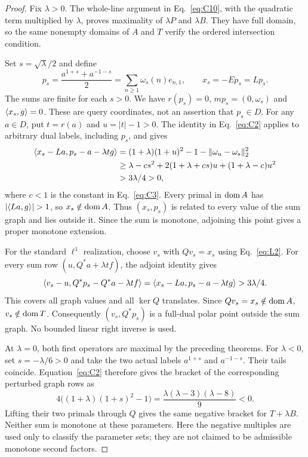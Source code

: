 \begin{proof}
Fix $\lambda>0$. The whole-line argument in Eq.~\eqref{eq:C10}, with
the quadratic term multiplied by $\lambda$, proves maximality of
$\lambda P$ and $\lambda B$. They have full domain, so the same nonempty
domains of $A$ and $T$ verify the ordered intersection condition.

Set $s=\sqrt\lambda/2$ and define
\begin{equation}
p_s=\frac{a^{1+s}+a^{-1-s}}2
   =\sum_{n\ge1}\omega_s(n)e_{n,1},\qquad x_s=-Ep_s=Lp_s.
\label{eq:parameter-query}
\end{equation}
The sums are finite for each $s>0$. We have $r(p_s)=0$,
$mp_s=(0,\omega_s)$ and $\langle x_s,g\rangle=0$. These are query coordinates,
not an assertion that $p_s\in D$.
For any $a\in D$, put $t=r(a)$ and $u=|t|-1>0$.
The identity in Eq.~\eqref{eq:C2} applies to arbitrary dual labels,
including $p_s$, and gives
\begin{equation}
\begin{aligned}
\langle x_s-La,p_s-a-\lambda t g\rangle
 &=(1+\lambda)(1+u)^2-1-\|\omega_u-\omega_s\|_2^2\\
 &\ge\lambda-cs^2+2(1+\lambda+cs)u+(1+\lambda-c)u^2\\
 &>3\lambda/4>0,
\end{aligned}
\label{eq:parameter-bracket}
\end{equation}
where $c<1$ is the constant in Eq.~\eqref{eq:C3}.
Every primal in $\operatorname{dom} A$ has $|\pair{La}{g}|>1$, so $x_s\notin\operatorname{dom} A$.
Thus $(x_s,p_s)$ is related to every value of the sum graph and lies
outside it. Since the sum is monotone, adjoining this point gives a
proper monotone extension.

For the standard $\ell^1$ realization, choose $v_s$ with $Qv_s=x_s$
using Eq.~\eqref{eq:L2}. For every sum row $(u,Q^*a+\lambda t f)$,
the adjoint identity gives
\begin{equation}
\langle v_s-u,Q^*p_s-Q^*a-\lambda t f\rangle
=\langle x_s-La,p_s-a-\lambda t g\rangle>3\lambda/4.
\label{eq:parameter-l1}
\end{equation}
This covers all graph values and all $\ker Q$ translates.
Since $Qv_s=x_s\notin\operatorname{dom} A$, $v_s\notin\operatorname{dom} T$.
Consequently $(v_s,Q^*p_s)$ is a full-dual polar point outside the sum
graph. No bounded linear right inverse is used.

At $\lambda=0$, both first operators are maximal by the preceding
theorems. For $\lambda<0$, set $s=-\lambda/6>0$ and take the two actual
labels $a^{1+s}$ and $a^{-1-s}$. Their tails coincide. Equation~\eqref{eq:C2}
therefore gives the bracket of the corresponding perturbed graph rows as
\begin{equation}
4\big((1+\lambda)(1+s)^2-1\big)
=\frac{\lambda(\lambda-3)(\lambda-8)}9<0.
\label{eq:parameter-negative}
\end{equation}
Lifting their two primals through $Q$ gives the same negative bracket
for $T+\lambda B$. Neither sum is monotone at these parameters.
Here the negative multiples are used only to classify the parameter
sets; they are not claimed to be admissible monotone second factors.


\end{proof}
